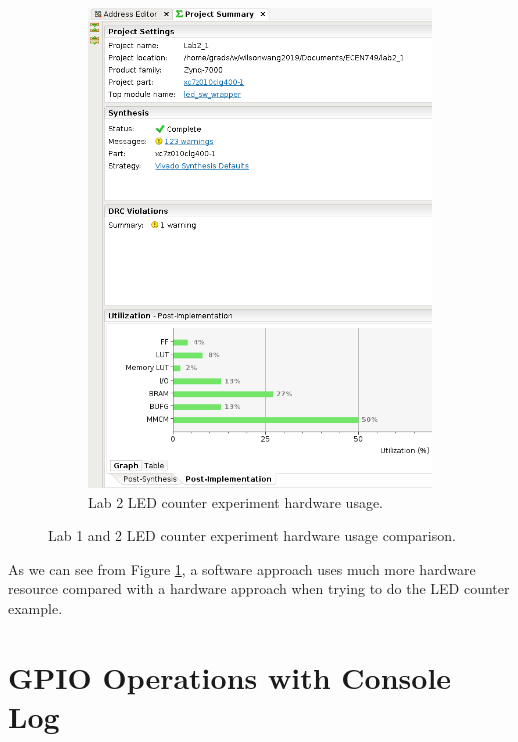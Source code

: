 \documentclass[11pt,letterpaper,titlepage]{article}
\begin{document}
\begin{figure}[h!]
    \begin{subfigure}{0.49\textwidth}
        \includegraphics[width=\linewidth]{Lab2_Hardware_Usage.png}
        \caption{Lab 2 LED counter experiment hardware usage.}
    \end{subfigure}
    \caption{Lab 1 and 2 LED counter experiment hardware usage comparison.}
    \label{hardware_comparison}
\end{figure}

As we can see from Figure \ref{hardware_comparison}, a software approach uses much more hardware resource compared with a hardware approach when trying to do the LED counter example.

\newpage

\section{GPIO Operations with Console Log}
\end{document}
